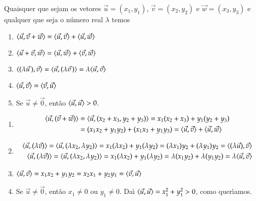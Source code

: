 \begin{proposicao}\label{propriedades-produto-interno}
  Quaisquer que sejam os vetores $\vec{u} = (x_1, y_1)$, $\vec{v} = (x_2, y_2)$ e $\vec{w} = (x_3, y_3)$ e qualquer que seja o n\'umero real $\lambda$ temos
  \begin{enumerate}[label=({\roman*})]
    \item\label{linearidade-produto-interno} $\langle \vec{u}, \vec{v} + \vec{w}\rangle = \langle \vec{u}, \vec{v} \rangle + \langle \vec{u}, \vec{w} \rangle$
    \item $\langle \vec{u} + \vec{v}, \vec{w}\rangle = \langle \vec{u}, \vec{w} \rangle + \langle \vec{v}, \vec{w} \rangle$
    \item\label{linearidade2-produto-interno} $\langle (\lambda \vec{u}\,), \vec{v}\rangle = \langle \vec{u}, (\lambda \vec{v}\,)\rangle = \lambda\langle \vec{u}, \vec{v} \rangle$
    \item $\langle \vec{u}, \vec{v} \rangle = \langle \vec{v}, \vec{u} \rangle$
    \item Se $\vec{u} \ne \vec{0}$, ent\~ao $\langle \vec{u}, \vec{u} \rangle > 0$.
  \end{enumerate}
\end{proposicao}
\begin{prova}
  \begin{enumerate}[label=({\roman*})]
    \item \begin{align*}
      \langle\vec{u}, (\vec{v} + \vec{w})\rangle &= \langle\vec{u}, (x_2 + x_3, y_2 + y_3)\rangle = x_1(x_2 + x_3) + y_1(y_2 + y_3) \\ &= (x_1x_2 + y_1y_2) + (x_1x_3 + y_1y_3) = \langle \vec{u}, \vec{v} \rangle + \langle \vec{u}, \vec{w} \rangle
    \end{align*}
    \item \begin{align*}
      \langle\vec{u}, (\lambda\vec{v})\rangle = \langle\vec{u}, (\lambda x_2, \lambda y_2)\rangle = x_1(\lambda x_2) + y_1(\lambda y_2) = (\lambda x_1)y_2 + (\lambda y_1)y_2 = \langle(\lambda\vec{u}),\vec{v}\rangle\\
      \langle\vec{u},(\lambda\vec{v})\rangle = \langle\vec{u}, (\lambda x_2, \lambda y_2)\rangle = x_1(\lambda x_2) + y_1(\lambda y_2) = \lambda (x_1y_2) + \lambda (y_1y_2) = \lambda\langle \vec{u}, \vec{v} \rangle
    \end{align*}
    \item $\langle \vec{u}, \vec{v} \rangle = x_1x_2 + y_1y_2 = x_2x_1 + y_2y_1 = \langle \vec{v}, \vec{u} \rangle$
    \item Se $\vec{u} \ne \vec{0}$, ent\~ao $x_1 \ne 0$ ou $y_1 \ne 0$. Da{\'\i} $\langle \vec{u}, \vec{u} \rangle = x_1^2 + y_1^2 > 0$, como quer{\'\i}amos.
  \end{enumerate}
\end{prova}

